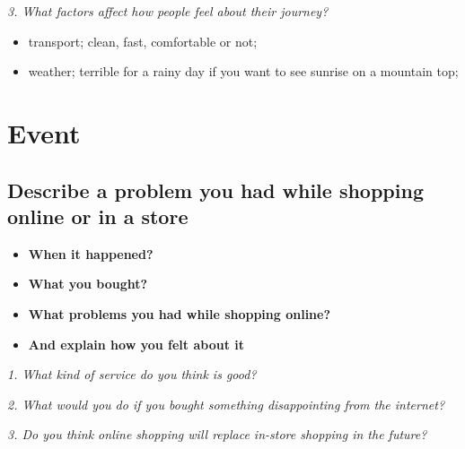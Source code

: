 \documentclass[conference]{IEEEtran}
\begin{document}
\textit{3. What factors affect how people feel about their journey?}
\begin{itemize}
    \item transport; clean, fast, comfortable or not;
    \item weather; terrible for a rainy day if you want to see sunrise on a mountain top;
\end{itemize}

\section{Event}
\subsection{Describe a problem you had while shopping online or in a store}
\begin{itemize}
    \item \textbf{When it happened?}
    \item \textbf{What you bought?}
    \item \textbf{What problems you had while shopping online?}
    \item \textbf{And explain how you felt about it}
\end{itemize}

\textit{1. What kind of service do you think is good?}

\textit{2. What would you do if you bought something disappointing from the internet?}

\textit{3. Do you think online shopping will replace in-store shopping in the future?}
\end{document}
